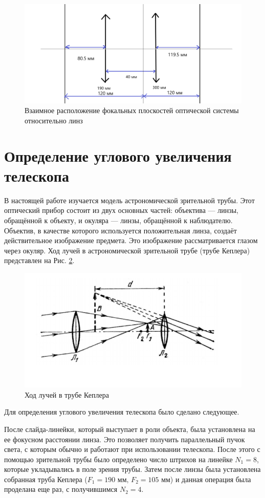 \documentclass[a4paper, 12pt]{article}
\begin{document}
\begin{figure}[H]
	\centering
	\includegraphics[width=\linewidth]{6}
	\caption{Взаимное расположение фокальных плоскостей оптической системы относительно линз}
	\label{fig:3_2}
\end{figure}


\section{Определение углового увеличения телескопа}

В настоящей работе изучается модель астрономической зрительной
трубы. Этот оптический прибор состоит из двух основных частей: объектива
— линзы, обращённой к объекту, и окуляра — линзы, обращённой к
наблюдателю. Объектив, в качестве которого используется положительная
линза, создаёт действительное изображение предмета. Это изображение
рассматривается глазом через окуляр. Ход лучей в астрономической
зрительной трубе (трубе Кеплера) представлен на Рис. \ref{fig:4_1}.

\begin{figure}[H]
	\centering
	\includegraphics[width=0.6\linewidth]{7}
	\caption{Ход лучей в трубе Кеплера}
	\label{fig:4_1}
\end{figure}

Для определения углового увеличения телескопа было сделано следующее.

После слайда-линейки, который выступает в роли объекта, была установлена на ее фокусном расстоянии линза. Это позволяет получить параллельный пучок света, с которым обычно и работают при использовании телескопа. После этого с помощью зрительной трубы было определено число штрихов на линейке $N_1 = 8$, которые укладывались в поле зрения трубы. Затем после линзы была установлена собранная труба Кеплера ($F_1 = 190 \text{ мм, } F_2 = 105 \text{ мм}$) и данная операция была проделана еще раз, с получившимся $N_2 = 4$.
\end{document}
